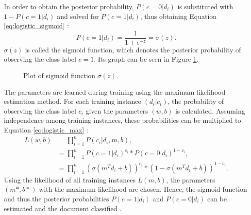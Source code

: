 In order to obtain the posterior probability, $P(c=0|d_i)$ is substituted with $1 - P(c=1|d_i)$ and solved for $P(c=1|d_i)$, thus obtaining Equation \eqref{eq:logistic_sigmoid} \cite{DBLP:books/aw/TanSKK2019}:
        {\begin{equation}
            \label{eq:logistic_sigmoid}
                P(c=1|d_i) = \frac{1}{1+e^{-z}} = \sigma(z).
        \end{equation}}
$\sigma(z)$ is called the sigmoid function, which denotes the posterior probability of observing the class label $c=1$. Its graph can be seen in Figure \ref{fig:sigmoid}.
        \begin{figure}
        \centering

    \caption{Plot of sigmoid function $\sigma(z)$.}
      \label{fig:sigmoid}
\end{figure}
The parameters are learned during training using the maximum likelihood estimation method. For each training instance $(d_i|c_i)$, the probability of observing the class label $c_i$ given the parameters $(w,b)$ is calculated. Assuming independence among training instances, these probabilities can be multiplied to Equation \eqref{eq:logistic_max} \cite{DBLP:books/aw/TanSKK2019}:
        \begin{equation}
        \begin{split}
            \label{eq:logistic_max}
                L(w,b) & = \prod_{i=1}^{n}P(c_i|d_i,m,b), \\
                        & = \prod_{i=1}^{n}P(c=1|d_i)^{c_i} * P(c=0|d_i)^{1-c_i}, \\
                    &    = \prod_{i=1}^{n}(\sigma(m^T d_i + b))^{c_i} * (1 - \sigma(m^T d_i + b))^{1-c_i}.
                        \end{split}
        \end{equation}
Using the likelihood of all training instances $L(m,b)$, the parameters $(m*,b*)$ with the maximum likelihood are chosen. Hence, the sigmoid function and thus the posterior probabilities $P(c=1|d_i)$ and $P(c=0|d_i)$ can be estimated and the document classified \cite{DBLP:books/aw/TanSKK2019}.


